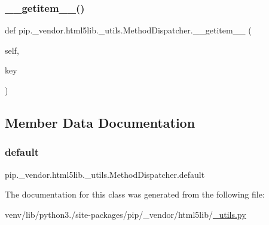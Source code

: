 \subsubsection{\texorpdfstring{\+\_\+\+\_\+getitem\+\_\+\+\_\+()}{\_\_getitem\_\_()}}
{\footnotesize\ttfamily def pip.\+\_\+vendor.\+html5lib.\+\_\+utils.\+Method\+Dispatcher.\+\_\+\+\_\+getitem\+\_\+\+\_\+ (\begin{DoxyParamCaption}\item[{}]{self,  }\item[{}]{key }\end{DoxyParamCaption})}



\subsection{Member Data Documentation}
\mbox{\label{classpip_1_1__vendor_1_1html5lib_1_1__utils_1_1MethodDispatcher_a2ac5c9766e49e08ca9d77597acec409d}} 
\subsubsection{\texorpdfstring{default}{default}}
{\footnotesize\ttfamily pip.\+\_\+vendor.\+html5lib.\+\_\+utils.\+Method\+Dispatcher.\+default}



The documentation for this class was generated from the following file\+:\begin{DoxyCompactItemize}
\item 
venv/lib/python3./site-\/packages/pip/\+\_\+vendor/html5lib/\hyperlink{html5lib_2__utils_8py}{\+\_\+utils.\+py}\end{DoxyCompactItemize}
